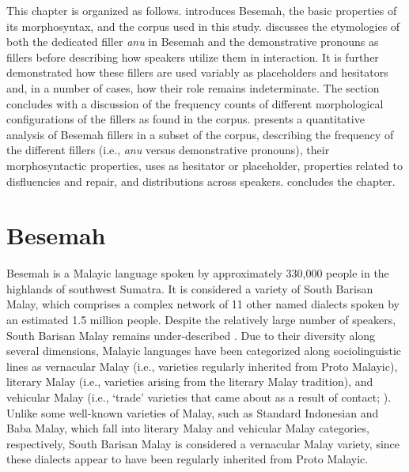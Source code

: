 \documentclass[output=paper,
\ChapterDOI{10.5281/zenodo.15697583}
colorlinks,
citecolor=brown]{langscibook}
\begin{document}
This chapter is organized as follows.  introduces Besemah, the basic properties of its morphosyntax, and the corpus used in this study.  discusses the etymologies of both the dedicated filler \textit{anu} in Besemah and the demonstrative pronouns as fillers before describing how speakers utilize them in interaction. It is further demonstrated how these fillers are used variably as placeholders and hesitators and, in a number of cases, how their role remains indeterminate. The section concludes with a discussion of the frequency counts of different morphological configurations of the fillers as found in the corpus.  presents a quantitative analysis of Besemah fillers in a subset of the corpus, describing the frequency of the different fillers (i.e., \textit{anu} versus demonstrative pronouns), their morphosyntactic properties, uses as hesitator or placeholder, properties related to disfluencies and repair, and distributions across speakers.  concludes the chapter.

\section{Besemah}\label{sec:besemah}
Besemah is a Malayic language spoken by approximately 330,000 people in the highlands of southwest Sumatra. It is considered a variety of South Barisan Malay, which comprises a complex network of 11 other named dialects spoken by an estimated 1.5 million people. Despite the relatively large number of speakers, South Barisan Malay remains under-described \citep[see][]{mcdonnell2016symmetrical}. Due to their diversity along several dimensions, Malayic languages have been categorized along sociolinguistic lines as vernacular Malay (i.e., varieties regularly inherited from Proto Malayic), literary Malay (i.e., varieties arising from the literary Malay tradition), and vehicular Malay (i.e., `trade' varieties that came about as a result of contact; \cite[for an overview of the complexities of these issues see][]{adelaar2005structural,mcdonnell2024malayic}). Unlike some well-known varieties of Malay, such as Standard Indonesian and Baba Malay, which fall into literary Malay and vehicular Malay categories, respectively, South Barisan Malay is considered a vernacular Malay variety, since these dialects appear to have been regularly inherited from Proto Malayic.
\end{document}
